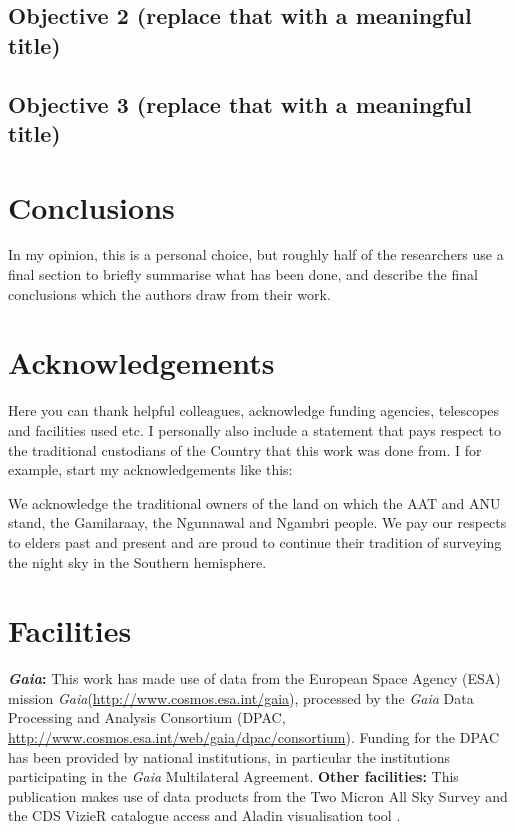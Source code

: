 \documentclass[fleqn,usenatbib]{mnras}
\newcommand{\Gaia}{\textit{Gaia}\xspace} %
\begin{document}
\subsection{Objective 2 (replace that with a meaningful title)} \label{sec:discussion_objective_2}

\subsection{Objective 3 (replace that with a meaningful title)} \label{sec:discussion_objective_3}


\section{Conclusions} \label{sec:conclusions}

In my opinion, this is a personal choice, but roughly half of the researchers use a final section to briefly summarise what has been done, and describe the final conclusions which the authors draw from their work.

\newpage

\section*{Acknowledgements}

Here you can thank helpful colleagues, acknowledge funding agencies, telescopes and facilities used etc. I personally also include a statement that pays respect to the traditional custodians of the Country that this work was done from. I for example, start my acknowledgements like this:

We acknowledge the traditional owners of the land on which the AAT and ANU stand, the Gamilaraay, the Ngunnawal and Ngambri people. We pay our respects to elders past and present and are proud to continue their tradition of surveying the night sky in the Southern hemisphere.


\section*{Facilities}

\textbf{\Gaia: } This work has made use of data from the European Space Agency (ESA) mission \Gaia (\url{http://www.cosmos.esa.int/gaia}), processed by the \Gaia Data Processing and Analysis Consortium (DPAC, \url{http://www.cosmos.esa.int/web/gaia/dpac/consortium}). Funding for the DPAC has been provided by national institutions, in particular the institutions participating in the \Gaia Multilateral Agreement. 
\textbf{Other facilities:} This publication makes use of data products from the Two Micron All Sky Survey \citep{Skrutskie2006} and the CDS VizieR catalogue access and Aladin visualisation tool \citep{Vizier2000,Aladin2000}.
\end{document}
